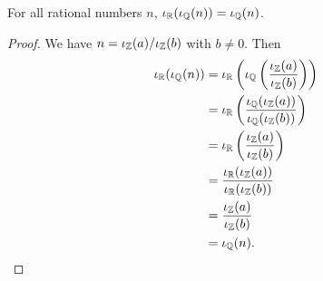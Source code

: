 \documentclass[../../math.tex]{subfiles}
\begin{document}
\begin{theorem}
    For all rational numbers $n$, $\iR(\iQ(n)) = \iQ(n)$.
\end{theorem}
\begin{proof}
    We have $n = \iZ(a)/\iZ(b)$ with $b \neq 0$.  Then
    \begin{align*}
        \iR(\iQ(n))
        &= \iR\left( \iQ\left( \frac{\iZ(a)}{\iZ(b)} \right) \right) \\
        &= \iR\left( \frac{\iQ(\iZ(a))}{\iQ(\iZ(b))} \right) \\
        &= \iR\left( \frac{\iZ(a)}{\iZ(b)} \right) \\
        &= \frac{\iR(\iZ(a))}{\iR(\iZ(b))} \\
        &= \frac{\iZ(a)}{\iZ(b)} \\
        &= \iQ(n).
    \end{align*}
\end{proof}
\end{document}
